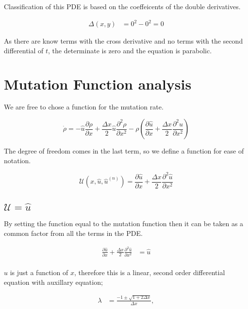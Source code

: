 \documentclass[a4paper]{article}
\begin{document}
Classification of this PDE is based on the coeffeicents of the double derivatives. 

\begin{align*}
\Delta (x , y) & = 0 ^2 - 0^ 2 = 0
\end{align*}

As there are know terms with the cross derivative and no terms with the second differential of $t$, the determinate is zero and the equation is parabolic. 
 
\newpage 
 
\section{Mutation Function analysis}

We are free to chose a function for the mutation rate. 

\begin{equation}
\dot{\rho} = - \hat{u} \frac{\partial \rho}{\partial x} + \frac{\Delta x}{2} \hat{u} \frac{\partial ^2 \rho}{\partial x ^2} - \rho \left( \frac{\partial \hat{u}}{\partial x} + \frac{\Delta x }{2} \frac{\partial ^2 \hat{u}}{\partial x^2} \right) 
\end{equation}

The degree of freedom comes in the last term, so we define a function for ease of notation. 

\begin{equation}
\mathcal{U} (x, \hat{u}, \hat{u} ^{(n)} ) = \frac{\partial \hat{u}}{\partial x} + \frac{\Delta x}{2} \frac{\partial ^2 \hat{u}}{\partial x^2}
\end{equation}

\subsection{$\mathcal{U} = \hat{u}$}

By setting the function equal to the mutation function then it can be taken as a common factor from all the terms in the PDE. 

\begin{align*}
 \frac{\partial \hat{u}}{\partial x} + \frac{\Delta x}{2} \frac{\partial ^2 \hat{u}}{\partial x^2} & = \hat{u} \\ 
\end{align*}

$\hat{u}$ is just a function of $x$, therefore this is a linear, second order differential equation with auxillary equation; 

\begin{align*}
\lambda & = \frac{- 1 \pm \sqrt{1 + 2 \Delta x}}{\Delta x},
\end{align*}
\end{document}
